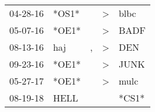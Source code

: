 \begin{supertabular}{p{0.07\textwidth}p{0.06\textwidth}p{0.02\textwidth}p{0.02\textwidth}p{0.06\textwidth}}
 04-28-16\textsuperscript{} &                   *OS1* &    &  \textgreater &  blbc\textsuperscript{} \\
 05-07-16\textsuperscript{} &                   *OE1* &    &  \textgreater &  BADF\textsuperscript{} \\
 08-13-16\textsuperscript{} &   haj\textsuperscript{} &  , &  \textgreater &   DEN\textsuperscript{} \\
 09-23-16\textsuperscript{} &                   *OE1* &    &  \textgreater &  JUNK\textsuperscript{} \\
 05-27-17\textsuperscript{} &                   *OE1* &    &  \textgreater &  mulc\textsuperscript{} \\
 08-19-18\textsuperscript{} &  HELL\textsuperscript{} &    &               &                   *CS1* \\
\end{supertabular}
